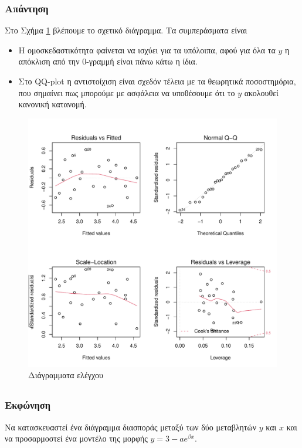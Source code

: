 \documentclass{article}
\begin{document}
\subsubsection*{Απάντηση}
Στο Σχήμα \ref{fig:part-b-fourplot} βλέπουμε το σχετικό διάγραμμα.
Τα συμπεράσματα είναι 
\begin{itemize}
    \item H ομοσκεδαστικότητα φαίνεται να ισχύει για τα υπόλοιπα,
    αφού για όλα τα \(y\) η απόκλιση από την 0-γραμμή είναι πάνω κάτω η ίδια.
    \item Στο \textlatin{QQ-plot} η αντιστοίχιση είναι σχεδόν τέλεια με τα θεωρητικά ποσοστημόρια, 
    που σημαίνει πως μπορούμε με ασφάλεια να υποθέσουμε ότι το \(y\) ακολουθεί κανονική κατανομή.
\end{itemize}
\begin{figure}[h]
    \centering
    \includegraphics[width=1.0\textwidth]{part-b-fourplot.pdf}
    \caption{Διάγραμματα ελέγχου}
    \label{fig:part-b-fourplot}
\end{figure}

\subsection{}
\subsubsection*{Εκφώνηση}
Να κατασκευαστεί ένα διάγραμμα διασποράς μεταξύ των δύο μεταβλητών \(y\) και \(x\) και να προσαρμοστεί ένα μοντέλο της μορφής \(y = 3 - a e^{\beta x}\).
\end{document}
